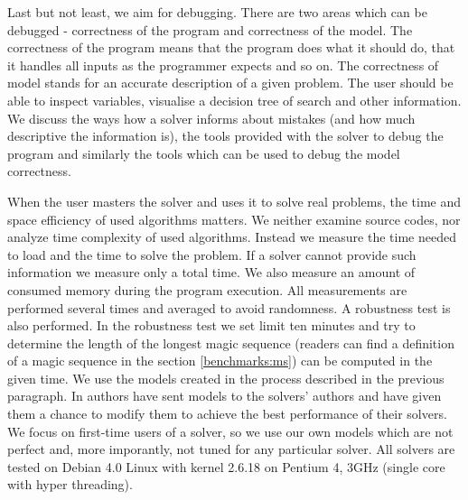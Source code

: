 Last but not least, we aim for debugging. There are two areas which can be 
debugged - correctness of the program and correctness of the model. The correctness of the
program means that the program does what it should do, that it handles all inputs as the programmer expects and so on. 
The correctness of model stands for an accurate description of a given problem. The user should be able to 
inspect variables, visualise a decision tree of search and other information. 
We discuss the ways how a solver informs about mistakes (and how much descriptive the 
information is), the tools provided with the solver to debug the program and similarly the 
tools which can be used to debug the model correctness.

When the user masters the solver and uses it to solve real problems, the time and space 
efficiency of used algorithms matters. We neither examine source codes, nor analyze 
time complexity of used algorithms. Instead we measure the time needed to 
load and the time to solve the problem. If a solver cannot provide such information 
we measure only a total time. We also measure an amount of consumed memory 
during the program execution. All measurements are performed several times 
and averaged to avoid randomness. A robustness test is also performed. 
In the robustness test we set limit ten minutes and try to determine the length of the longest magic 
sequence (readers can find a definition of a magic sequence in the section \ref{benchmarks:ms}) 
can be computed in the given time. We use the models created in the process described in the previous 
paragraph. In \cite{fernandez00} authors have sent models to the solvers' authors and 
have given them a chance to modify them to achieve the best performance of their solvers. 
We focus on first-time users of a solver, so we use our own models which are 
not perfect and, more imporantly, not tuned for any particular solver. All solvers 
are tested on Debian 4.0 Linux with kernel 2.6.18 on Pentium 4, 3GHz (single core 
with hyper threading).